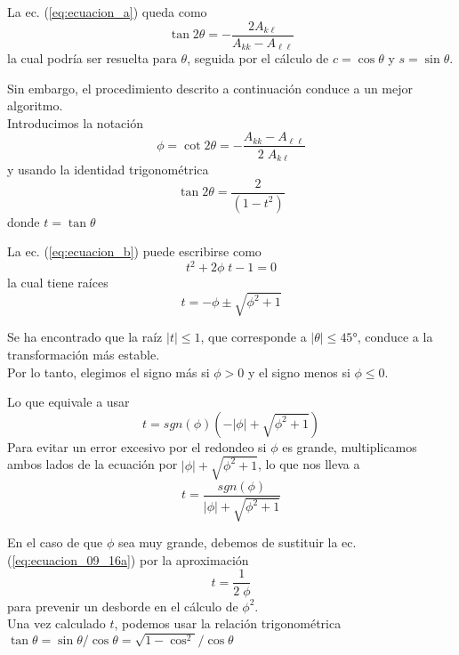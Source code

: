 \begin{frame}
La ec. (\ref{eq:ecuacion_a}) queda como
\begin{equation}
\tan 2 \theta = - \dfrac{2 A_{k \ell}}{A_{k k} - A_{\ell \ell}}
\label{eq:ecuacion_b}
\end{equation}
la cual podría ser resuelta para $\theta$, seguida por el cálculo de $c = \cos \theta$ y $s = \sin \theta$.
\end{frame}
\begin{frame}
Sin embargo, el procedimiento descrito a continuación conduce a un mejor algoritmo.
\\
\bigskip
Introducimos la notación
\begin{equation}
\phi = \cot 2 \theta = - \dfrac{A_{k k} - A_{\ell \ell}}{2 \; A_{k \ell}}
\label{eq:ecuacion_09_15}
\end{equation}
y usando la identidad trigonométrica
\[ \tan 2 \theta = \dfrac{2}{(1 - t^{2})} \]
donde $t = \tan \theta$
\end{frame}
\begin{frame}
La ec. (\ref{eq:ecuacion_b}) puede escribirse como
\[ t^{2} +  2 \phi \; t - 1 = 0 \]
la cual tiene raíces
\[ t =  - \phi \pm \sqrt{\phi^{2} + 1} \]
\end{frame}
\begin{frame}
Se ha encontrado que la raíz $\vert t \vert \leq 1$, que corresponde a $\vert \theta \vert \leq 45\si{\degree}$, conduce a la transformación más estable.
\\
\bigskip
Por lo tanto, elegimos el signo más si $\phi > 0$  y el signo menos si $\phi \leq 0$.
\end{frame}
\begin{frame}
Lo que equivale a usar
\[ t = sgn(\phi) \left( - \vert \phi \vert + \sqrt{\phi^{2} + 1} \right) \]
\pause
Para evitar un error excesivo por el redondeo si $\phi$ es grande, multiplicamos ambos lados de la ecuación por $\vert \phi \vert + \sqrt{\phi^{2} + 1}$, lo que nos lleva a
\begin{equation}
t = \dfrac{sgn(\phi)}{\vert \phi \vert + \sqrt{\phi^{2} + 1}}
\label{eq:ecuacion_09_16a}
\end{equation}
\end{frame}
\begin{frame}
En el caso de que $\phi$ sea muy grande, debemos de sustituir la ec. (\ref{eq:ecuacion_09_16a}) por la aproximación
\begin{equation}
t = \dfrac{1}{2 \; \phi}
\label{eq:ecuacion_09_16b}
\end{equation}
\pause
para prevenir un desborde en el cálculo de $\phi^{2}$.
\\
\bigskip
Una vez calculado $t$, podemos usar la relación trigonométrica $\tan \theta = \sin \theta / \cos \theta = \sqrt{1 - \cos^{2}} / \cos \theta$
\end{frame}
